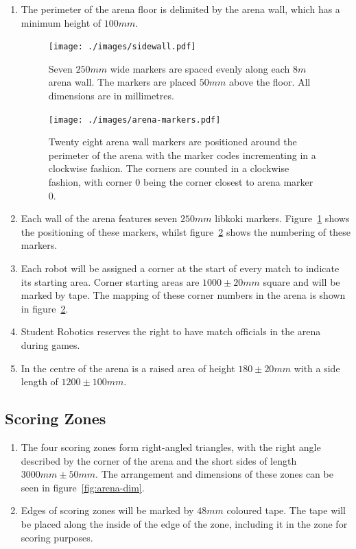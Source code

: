 \begin{enumerate}
\item The perimeter of the arena floor is delimited by the arena wall, which has a minimum height of $100mm$.

\begin{figure}
  \centering
  \texttt{[image: ./images/sidewall.pdf]}
  \caption{Seven $250mm$ wide markers are spaced evenly along each $8m$ arena wall.
           The markers are placed $50mm$ above the floor.
           All dimensions are in millimetres.}
  \label{fig:arena-wall}
\end{figure}

\begin{figure}
  \centering
  \texttt{[image: ./images/arena-markers.pdf]}
  \caption{Twenty eight arena wall markers are positioned around the perimeter of the arena with the marker codes incrementing in a clockwise fashion.
           The corners are counted in a clockwise fashion, with corner 0 being the corner closest to arena marker 0.}
  \label{fig:arena-zones}
\end{figure}

\item Each wall of the arena features seven $250mm$ libkoki markers.
      Figure~\ref{fig:arena-wall} shows the positioning of these markers, whilst figure~\ref{fig:arena-zones} shows the numbering of these markers.

\item Each robot will be assigned a corner at the start of every match to indicate its starting area.
      Corner starting areas are $1000 \pm 20mm$ square and will be marked by tape.
      The mapping of these corner numbers in the arena is shown in figure~\ref{fig:arena-zones}.

\item Student Robotics reserves the right to have match officials in the arena during games.

\item In the centre of the arena is a raised area of height $180 \pm 20mm$ with a side length of $1200 \pm 100 mm$.

\end{enumerate}


\subsection{Scoring Zones}
\label{sub:Zones}

\begin{enumerate}
\item The four scoring zones form right-angled triangles, with the right angle described by the corner of the arena and the short sides of length $3000mm \pm 50mm$.
      The arrangement and dimensions of these zones can be seen in figure~\ref{fig:arena-dim}.

\item Edges of scoring zones will be marked by $48mm$ coloured tape.
      The tape will be placed along the inside of the edge of the zone, including it in the zone for scoring purposes.
\end{enumerate}

